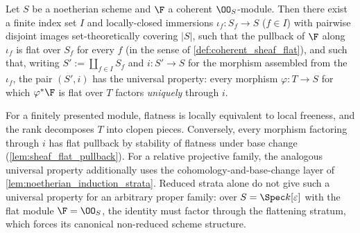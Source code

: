 \begin{theorem}[Universal property of the flat-locus stratification (case
  \(n = 0\))]
  \label{thm:flattening_stratification_universal}
  \leanok
  Let \(S\) be a noetherian scheme and \(\F\) a coherent \(\OO_S\)-module.
  Then there exist a finite index set \(I\) and locally-closed immersions
  \(\iota_f : S_f \to S\) (\(f \in I\)) with pairwise disjoint images
  set-theoretically covering \(|S|\), such that the pullback of \(\F\)
  along \(\iota_f\) is flat over \(S_f\) for every \(f\) (in the sense of
  \cref{def:coherent_sheaf_flat}), and such that, writing
  \(S' := \coprod_{f \in I} S_f\) and \(i : S' \to S\) for the morphism
  assembled from the \(\iota_f\), the pair \((S', i)\) has the universal
  property: every morphism \(\varphi : T \to S\) for which
  \(\varphi^* \F\) is flat over \(T\) factors \emph{uniquely} through
  \(i\).

  For a finitely presented module, flatness is locally equivalent to local
  freeness, and the rank decomposes \(T\) into clopen pieces.  Conversely,
  every morphism factoring through \(i\) has flat pullback by stability of
  flatness under base change (\cref{lem:sheaf_flat_pullback}).  For a relative
  projective family, the analogous universal property additionally uses the
  cohomology-and-base-change layer of
  \cref{lem:noetherian_induction_strata}.  Reduced strata alone do not give
  such a universal property for an arbitrary proper family: over
  \(S = \Spec k[\varepsilon]\) with the flat module \(\F = \OO_S\), the
  identity must factor through the flattening stratum, which forces its
  canonical non-reduced scheme structure.
\end{theorem}

